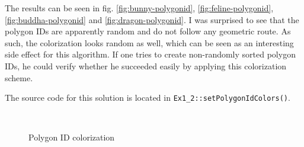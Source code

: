 \documentclass[a4paper,10pt,notitlepage]{scrreprt}
\begin{document}
The results can be seen in fig. \ref{fig:bunny-polygonid},
\ref{fig:feline-polygonid}, \ref{fig:buddha-polygonid} and
\ref{fig:dragon-polygonid}. I was
surprised to see that the polygon IDs are apparently random and do not follow
any geometric route. As such, the colorization looks random as well, which can
be seen as an interesting side effect for this algorithm. If one tries to
create non-randomly sorted polygon IDs, he could verify whether he succeeded
easily by applying this colorization scheme.

The source code for this solution is located in
\texttt{Ex1\_2::setPolygonIdColors()}.

\begin{figure}
  \centering


  \\

  \caption{Polygon ID colorization}
\end{figure}
\end{document}
